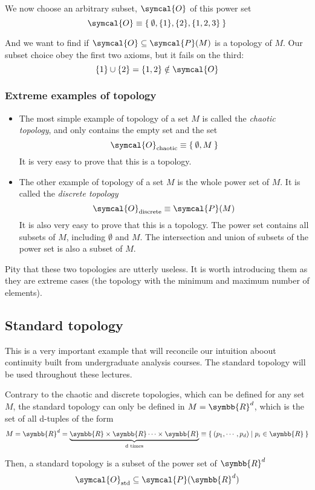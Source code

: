 We now choose an arbitrary subset, $\symcal{O}$ of this power set
\[
  \symcal{O} \equiv \Set{\emptyset, \{1\}, \{2\}, \{1,2,3\}}
\]

And we want to find if $\symcal{O} \subseteq \symcal{P}(M)$ is a topology of
$M$. Our subset choice obey the first two axioms, but it fails on the third:
\[
  \{1\}\cup\{2\} = \{1,2\}\notin\symcal{O}
\]

\subsubsection{Extreme examples of topology}
\begin{itemize}
\item The most simple example of topology of a set $M$ is called the
  \emph{chaotic topology}, and only contains the empty set and the set
  \[
    \symcal{O}_{\text{chaotic}} \equiv \Set{\emptyset, M}
  \]
  It is very easy to prove that this is a topology.
\item The other example of topology of a set $M$ is the whole power set of $M$.
  It is called the \emph{discrete topology}
  \[
    \symcal{O}_{\text{discrete}} \equiv \symcal{P}(M)
  \]
  It is also very easy to prove that this is a topology. The power set contains
  all subsets of $M$, including $\emptyset$ and $M$. The intersection and union
  of subsets of the power set is also a subset of $M$.
\end{itemize}
Pity that these two topologies are utterly useless. It is worth introducing
them as they are extreme cases (the topology with the minimum and maximum
number of elements).

\subsection{Standard topology}
This is a very important example that will reconcile our intuition aboout
continuity built from undergraduate analysis courses. The standard topology
will be used throughout these lectures.

Contrary to the chaotic and discrete topologies, which can be defined for any
set $M$, the standard topology can only be defined in $M = \symbb{R}^d$, which
is the set of all d-tuples of the form
\[
  M = \symbb{R}^d
  = \underbrace{\symbb{R}\times\symbb{R}\cdots\times\symbb{R}}_{\text{d times}}
  \equiv \Set{(p_1, \cdots, p_d) | p_i\in\symbb{R}}
\]

Then, a standard topology is a subset of the power set of $\symbb{R}^d$
\[
  \symcal{O}_{\text{std}} \subseteq \symcal{P}(\symbb{R}^d)
\]

